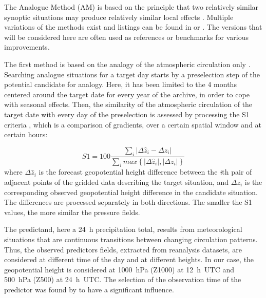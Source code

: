 \documentclass[hess]{copernicus}
\begin{document}
\introduction  %

The Analogue Method (AM) is based on the principle that two relatively similar synoptic situations may produce relatively similar local effects \citep{Lorenz1956, Lorenz1969}. Multiple variations of the methods exist and listings can be found in \citet{Horton2016} or \citet{BenDaoud2015}. The versions that will be considered here are often used as references or benchmarks for various improvements.

The first method is based on the analogy of the atmospheric circulation only \citep[Table \ref{table:method_2Z},][]{Obled2002, Bontron2005, Marty2012}. Searching analogue situations for a target day starts by a preselection step of the potential candidate for analogy. Here, it has been limited to the 4 months centered around the target date for every year of the archive, in order to cope with seasonal effects. Then, the similarity of the atmospheric circulation of the target date with every day of the preselection is assessed by processing the S1 criteria \citep[Eq.\ \ref{eq:S1}, ][]{Teweles1954, Drosdowsky2003}, which is a comparison of gradients, over a certain spatial window and at certain hours:

\begin{equation}
\label{eq:S1}
S1=100 \frac {\displaystyle \sum_{i} \vert \Delta\hat{z}_{i} - \Delta z_{i} \vert}
{\displaystyle \sum_{i} max\left\lbrace \vert \Delta\hat{z}_{i} \vert , \vert \Delta z_{i} \vert \right\rbrace }
\end{equation}
where $\Delta \hat{z}_{i}$ is the forecast geopotential height difference between the \textit{i}th pair of adjacent points of the gridded data describing the target situation, and $\Delta z_{i}$ is the corresponding observed geopotential height difference in the candidate situation. The differences are processed separately in both directions. The smaller the S1 values, the more similar the pressure fields.

The predictand, here a 24~h precipitation total, results from meteorological situations that are continuous transitions between changing circulation patterns. Thus, the observed predictors fields, extracted from reanalysis datasets, are considered at different time of the day and at different heights. In our case, the geopotential height is considered at 1000~hPa (Z1000) at 12~h~UTC and 500~hPa (Z500) at 24~h~UTC. The selection of the observation time of the predictor was found by \citet{Bontron2004} to have a significant influence.
\end{document}
